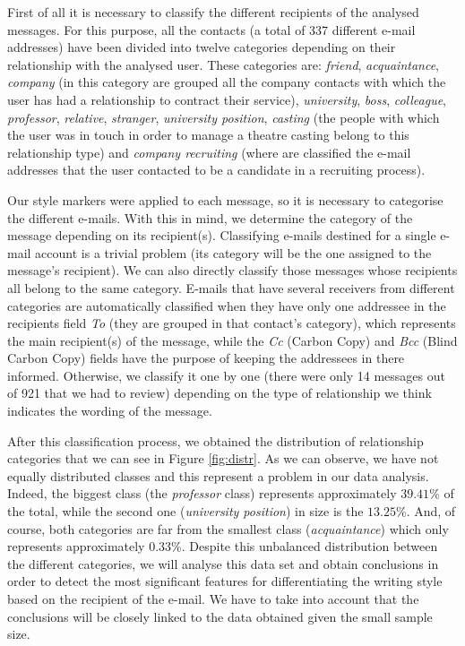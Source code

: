 First of all it is necessary to classify the different recipients of the analysed messages. For this purpose, all the contacts (a total of 337 different e-mail addresses) have been divided into twelve categories depending on their relationship with the analysed user. These categories are: \textit{friend}, \textit{acquaintance}, \textit{company} (in this category are grouped all the company contacts with which the user has had a relationship to contract their service), \textit{university}, \textit{boss}, \textit{colleague}, \textit{professor}, \textit{relative}, \textit{stranger}, \textit{university position}, \textit{casting} (the people with which the user was in touch in order to manage a theatre casting belong to this relationship type) and \textit{company recruiting} (where are classified the e-mail addresses that the user contacted to be a candidate in a recruiting process).

Our style markers were applied to each message, so it is necessary to categorise the different e-mails. With this in mind, we determine the category of the message depending on its recipient(s). Classifying e-mails destined for a single e-mail account is a trivial problem (its category will be the one assigned to the message's recipient). We can also directly classify those messages whose recipients all belong to the same category. E-mails that have several receivers from different categories are automatically classified when they have only one addressee in the recipients field \textit{To} (they are grouped in that contact's category), which represents the main recipient(s) of the message, while the \textit{Cc} (Carbon Copy) and \textit{Bcc} (Blind Carbon Copy) fields have the purpose of keeping the addressees in there informed. Otherwise, we classify it one by one (there were only 14 messages out of 921 that we had to review) depending on the type of relationship we think indicates the wording of the message.

After this classification process, we obtained the distribution of relationship categories that we can see in Figure \ref{fig:distr}. As we can observe, we have not equally distributed classes and this represent a problem in our data analysis. Indeed, the biggest class (the \textit{professor} class) represents approximately $39.41$\% of the total, while the second one (\textit{university position}) in size is the $13.25$\%. And, of course, both categories are far from the smallest class (\textit{acquaintance}) which only represents approximately $0.33$\%. Despite this unbalanced distribution between the different categories, we will analyse this data set and obtain conclusions in order to detect the most significant features for differentiating the writing style based on the recipient of the e-mail. We have to take into account that the conclusions will be closely linked to the data obtained given the small sample size.

